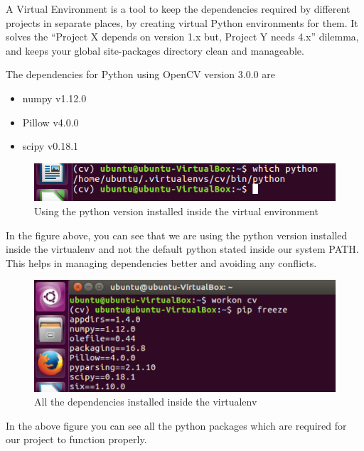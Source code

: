 \documentclass[BTech]{srmuthesis}
\begin{document}
A Virtual Environment is a tool to keep the dependencies required by different projects in separate places, by creating virtual Python environments for them. It solves the “Project X depends on version 1.x but, Project Y needs 4.x” dilemma, and keeps your global site-packages directory clean and manageable.

The dependencies for Python using OpenCV version 3.0.0 are 

\begin{itemize}
    \item numpy v1.12.0
    \item Pillow v4.0.0
    \item scipy v0.18.1
\end{itemize}

\begin{figure}[h]
    \centering
    \includegraphics[width=15cm\textwidth]{virtualenv}
    \caption{Using the python version installed inside the virtual environment}
    \label{fig:virtual env}
\end{figure}

In the figure above, you can see that we are using the python version installed inside the virtualenv and not the default python stated inside our system PATH. This helps in managing dependencies better and avoiding any conflicts.

\begin{figure}[h]
    \centering
    \includegraphics[width=15cm\textwidth]{pip-freeze}
    \caption{All the dependencies installed inside the virtualenv}
    \label{fig:virtual env pip freeze}
\end{figure}

In the above figure you can see all the python packages which are required for our project to function properly.
\end{document}
